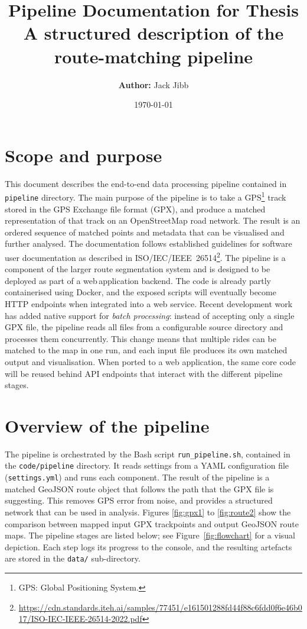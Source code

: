 \documentclass[11pt,a4paper]{article}
\title{Pipeline Documentation for Thesis \\[0.5em]
\large A structured description of the route-matching pipeline}
\author{\textbf{Author:} Jack Jibb}
\date{\today}
\begin{document}
\maketitle

\section*{Scope and purpose}
This document describes the end-to-end data processing pipeline contained in \texttt{pipeline} directory.  The main purpose of the pipeline is to take a GPS\footnote{GPS: Global Positioning System.} track stored in the GPS Exchange file format (GPX), and produce a matched representation of that track on an OpenStreetMap road network.  The result is an ordered sequence of matched points and metadata that can be visualised and further analysed.  The documentation follows established guidelines for software user documentation as described in ISO/IEC/IEEE~26514\footnote{\url{https://cdn.standards.iteh.ai/samples/77451/e161501288fd44f88c6fdd0f6e46b017/ISO-IEC-IEEE-26514-2022.pdf}}. The pipeline is a component of the larger route segmentation system and is designed to be deployed as part of a web\,application backend. The code is already partly containerised using Docker, and the exposed scripts will eventually become HTTP endpoints when integrated into a web service. Recent development work has added native support for \emph{batch processing}: instead of accepting only a single GPX file, the pipeline reads all files from a configurable source directory and processes them concurrently.  This change means that multiple rides can be matched to the map in one run, and each input file produces its own matched output and visualisation. When ported to a web application, the same core code will be reused behind API endpoints that interact with the different pipeline stages. \citep{gpx-format}

\section{Overview of the pipeline}
The pipeline is orchestrated by the Bash script \texttt{run\_pipeline.sh}, contained in the \texttt{code/pipeline} directory. It reads settings from a YAML configuration file (\texttt{settings.yml}) and runs each component. The result of the pipeline is a matched GeoJSON route object that follows the path that the GPX file is suggesting. This removes GPS error from noise, and provides a structured network that can be used in analysis\citep{Saki2022}. Figures \ref{fig:gpx1} to \ref{fig:route2} show the comparison between mapped input GPX trackpoints and output GeoJSON route maps. The pipeline stages are listed below; see Figure~\ref{fig:flowchart} for a visual depiction.  Each step logs its progress to the console, and the resulting artefacts are stored in the \texttt{data/} sub-directory.
\end{document}
